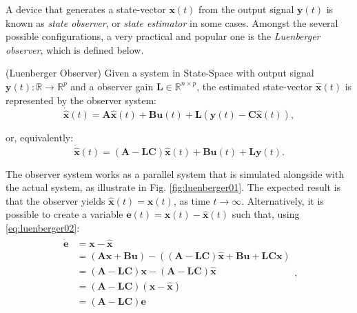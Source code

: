\documentclass[a4paper,11pt]{book}
\numberwithin{figure}{chapter}
\numberwithin{equation}{chapter}
\numberwithin{table}{chapter}
\theoremstyle{definition}
\newtheorem{definition}{Definition}[chapter]
\newcounter{boxed-theorem}
\newcounter{boxed-definition}
\newenvironment{boxed-definition}[1]
{\begin{shaded} \begin{definition}{#1}}
{\end{definition} \end{shaded}}
\begin{document}
A device that generates a state-vector $\bm{x}(t)$ from the output signal $\bm{y}(t)$ is known as \textit{state observer}, or \textit{state estimator} in some cases. Amongst the several possible configurations, a very practical and popular one is the \textit{Luenberger observer}, which is defined below.

\begin{boxed-definition}{(Luenberger Observer)} \label{def:luenberger}
    Given a system in State-Space with output signal $\bm{y}(t) : \mathbb{R} \rightarrow \mathbb{R}^p$ and a observer gain $\bm{L} \in \mathbb{R}^{n \times p}$, the estimated state-vector $\hat{\bm{x}}(t)$ is represented by the observer system:
    \begin{equation}
        \dot{\hat{\bm{x}}}(t) = \bm{A} \hat{\bm{x}}(t) + \bm{B} \bm{u}(t) + \bm{L} \left( \bm{y}(t) - \bm{C} \hat{\bm{x}}(t) \right)
    ,\end{equation}
    
    \noindent or, equivalently:
    \begin{equation} \label{eq:luenberger02}
        \dot{\hat{\bm{x}}}(t) = \left( \bm{A} - \bm{L} \bm{C} \right) \hat{\bm{x}}(t) + \bm{B} \bm{u}(t) + \bm{L} \bm{y}(t)
    .\end{equation}
\end{boxed-definition}

The observer system works as a parallel system that is simulated alongside with the actual system, as illustrate in Fig. \ref{fig:luenberger01}. The expected result is that the observer yields $\hat{\bm{x}}(t) = \bm{x}(t)$, as time $t \to \infty$. Alternatively, it is possible to create a variable $\bm{e}(t) = \bm{x}(t) - \hat{\bm{x}}(t)$ such that, using \eqref{eq:luenberger02}:
\begin{align}
\begin{split}
    \dot{\bm{e}} &= \bm{x} - \hat{\bm{x}} \\ 
        &= \left( \bm{A} \bm{x} + \bm{B} \bm{u} \right) - \left( \left( \bm{A} - \bm{L} \bm{C} \right) \hat{\bm{x}} + \bm{B} \bm{u} + \bm{L} \bm{C} \bm{x} \right) \\
        &= \left( \bm{A} - \bm{L} \bm{C} \right) \bm{x} - \left( \bm{A} - \bm{L} \bm{C} \right) \hat{\bm{x}} \\
        &= \left( \bm{A} - \bm{L} \bm{C} \right) \left( \bm{x} - \hat{\bm{x}} \right) \\
        &= \left( \bm{A} - \bm{L} \bm{C} \right) \bm{e}
\end{split}
,\end{align}
\end{document}
